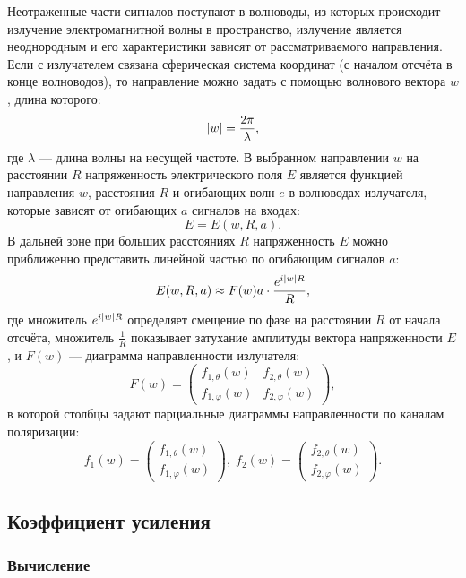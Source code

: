 Неотраженные части сигналов поступают в волноводы, из которых происходит излучение электромагнитной волны в пространство, излучение является неоднородным и его характеристики
зависят от рассматриваемого направления. Если с излучателем связана сферическая система координат (с началом отсчёта в конце волноводов), то направление можно задать с
помощью волнового вектора $w$, длина которого:
\[
    \left | w \right | = \frac{2 \pi}{\lambda},
\]
где $\lambda$ --- длина волны на несущей частоте. В выбранном направлении $w$ на расстоянии $R$ напряженность электрического поля $E$ является функцией
направления $w$, расстояния $R$ и огибающих волн $e$ в волноводах излучателя, которые зависят от огибающих $a$ сигналов на входах:
\[
    E = E(w, R, a).
\]
В дальней зоне при больших расстояниях $R$ напряженность $E$ можно приближенно представить линейной частью по огибающим сигналов $a$:
\begin{equation}
    \label{emission:emitter:diagram:tension}
    E(w,R,a)
    \approx F(w) a \cdot \frac{e^{i \left | w \right | R}}{R} ,
\end{equation}
где множитель $e^{i \left | w \right | R}$ определяет смещение по фазе на расстоянии $R$ от начала отсчёта, множитель $\frac{1}{R}$ показывает затухание амплитуды
вектора напряженности $E$, и $F(w)$ --- диаграмма направленности излучателя:
\[
    F(w)
    = \begin{pmatrix}
          f_{1, \theta}(w)  & f_{2, \theta}(w)  \\
          f_{1, \varphi}(w) & f_{2, \varphi}(w)
    \end{pmatrix} ,
\]
в которой столбцы задают парциальные диаграммы направленности по каналам поляризации:
\[
    f_1(w)
    = \begin{pmatrix}
          f_{1,\theta}(w) \\
          f_{1,\varphi}(w)
    \end{pmatrix}
    , \;
    f_2(w)
    = \begin{pmatrix}
          f_{2,\theta}(w) \\
          f_{2,\varphi}(w)
    \end{pmatrix}
    .
\]

\subsection{Коэффициент усиления}

\subsubsection{Вычисление}

